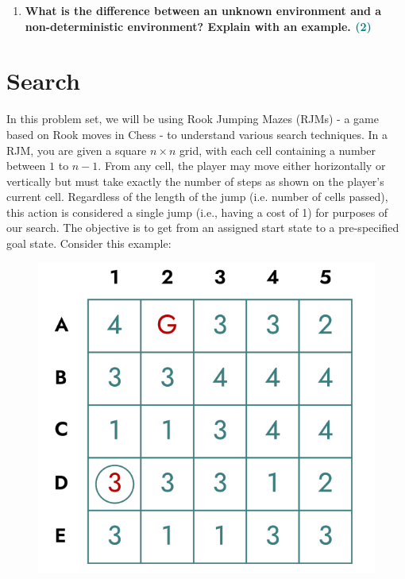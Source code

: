 \documentclass[a4paper]{article}
\begin{document}
\begin{sloppypar}
\begin{enumerate}[start=1,label=Q\arabic*,left=0pt]
    \item \textbf{What is the difference between an unknown environment and a non-deterministic environment? Explain with an example. \hfill \textcolor{teal}{(2)}}
    
    \par
    
\end{enumerate}

\section{Search}

In this problem set, we will be using Rook Jumping Mazes (RJMs) - a game based on
Rook moves in Chess - to understand various search techniques. In a RJM, you are
given a square $n \times n$ grid, with each cell containing a number between $1$ to $n - 1$. From
any cell, the player may move either horizontally or vertically but must take exactly the
number of steps as shown on the player’s current cell. Regardless of the length of the
jump (i.e. number of cells passed), this action is considered a single jump (i.e., having a
cost of 1) for purposes of our search. The objective is to get from an assigned start state
to a pre-specified goal state. Consider this example:

\begin{figure}[H]
    \centering  
    \includegraphics[height=0.2\textheight]{Search_RJM.png}
    \label{fig:Search_RJM}
\end{figure}


\end{sloppypar}
\end{document}
